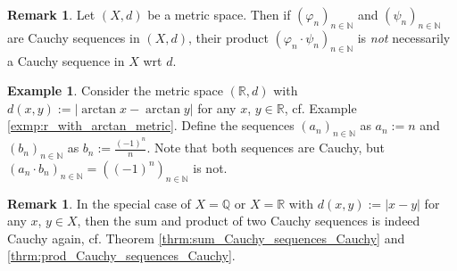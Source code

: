 \documentclass[12pt, a4paper]{article}
\numberwithin{equation}{section}
\theoremstyle{definition}
\theoremstyle{definition}
\newtheorem{exmp}[thm]{Example} %
\newtheorem{remark}[thm]{Remark} %
\newcommand{\abs}[1]{\left\vert #1 \right\vert}
\newcommand{\seq}[1][\varphi]{\left( #1 \right)_{n \in \mathbb{N}}}
\begin{document}
	\begin{remark}
		Let $(X, d)$ be a metric space. Then if $\seq[\varphi_n]$ and $\seq[\psi_n]$ are Cauchy sequences in $(X, d)$, their product $\seq[\varphi_n \cdot \psi_n]$ is \textit{not} necessarily a Cauchy sequence in $X$ wrt $d$.
	\end{remark}

	\begin{exmp}\label{exmp:counter_exmp_prod_Cauchy_not_Cauchy}
		Consider the metric space $(\mathbb R, d)$ with $d(x, y) := \abs{\arctan x - \arctan y}$ for any $x$, $y\in\mathbb R$, cf. Example \ref{exmp:r_with_arctan_metric}. Define the sequences $\seq[a_n]$ as $a_n := n$ and $\seq[b_n]$ as $b_n := \frac{(-1)^n}{n}$. Note that both sequences are Cauchy, but $\seq[a_n \cdot b_n] = \seq[(-1)^n]$ is not.
	\end{exmp}
	
	\begin{remark}
		In the special case of $X = \mathbb Q$ or $X = \mathbb R$ with $d(x, y) := \abs{x - y}$ for any $x$, $y\in X$, then the sum and product of two Cauchy sequences is indeed Cauchy again, cf. Theorem \ref{thrm:sum_Cauchy_sequences_Cauchy} and \ref{thrm:prod_Cauchy_sequences_Cauchy}.
	\end{remark}
	
\end{document}
